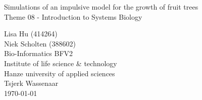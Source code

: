 \begin{center}


\Huge{Simulations of an impulsive model for the growth of fruit trees}\\
\vspace{\baselineskip}
\LARGE{Theme 08 - Introduction to Systems Biology}\\
\vspace{\baselineskip}

\end{center}
\vspace{\baselineskip}

\normalsize
\vspace*{\fill}
\begin{flushright}
Lisa Hu (414264)\\
Niek Scholten (388602)\\
Bio-Informatics BFV2\\
Institute of life science \& technology\\
Hanze university of applied sciences\\
Tsjerk Wassenaar\\
\today
\end{flushright}
\newpage